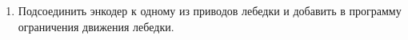 \begin{enumerate}
\begin{enumerate}
	  \item Подсоединить энкодер к одному из приводов лебедки и добавить в программу ограничения движения лебедки.\newline
	  
    \end{enumerate}     
\end{enumerate}

\fillpage
